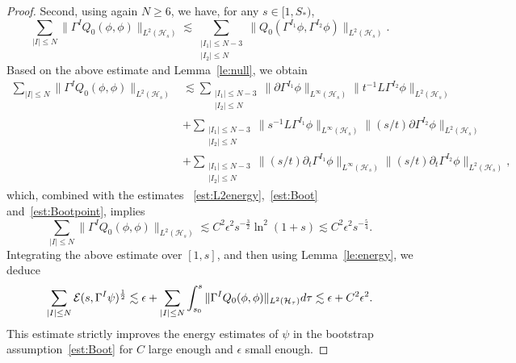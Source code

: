 \documentclass[10pt,a4paper]{amsart}
\def \d {{\rm{d}}}
\begin{document}
\begin{proof}
\smallskip
Second, using again $N\ge 6$, we have, for any $s\in [1,S_{*})$,  
\begin{equation*}
     \sum_{|I|\le N}\|\Gamma^{I}Q_{0}(\phi,\phi)\|_{L^{2}(\mathcal{H}_{s})}
    \lesssim \sum_{\substack{|I_{1}|\le N-3\\ |I_{2}|\le N}}
    \|Q_{0}(\Gamma^{I_{1}}\phi,\Gamma^{I_{2}}\phi)\|_{L^{2}(\mathcal{H}_{s})}.
\end{equation*}
Based on the above estimate and Lemma~\ref{le:null}, we obtain 
\begin{equation*}
\begin{aligned}
     \sum_{|I|\le N}\|\Gamma^{I}Q_{0}(\phi,\phi)\|_{L^{2}(\mathcal{H}_{s})}
    &\lesssim \sum_{\substack{|I_{1}|\le N-3\\ |I_{2}|\le N}}
    \|\partial \Gamma^{I_{1}}\phi\|_{L^{\infty}(\mathcal{H}_{s})}
    \|t^{-1}L\Gamma^{I_{2}}\phi\|_{L^{2}(\mathcal{H}_{s})}\\
    &+\sum_{\substack{|I_{1}|\le N-3\\ |I_{2}|\le N}}
    \|s^{-1}L\Gamma^{I_{1}}\phi\|_{L^{\infty}(\mathcal{H}_{s})}
    \|(s/t)\partial \Gamma^{I_{2}}\phi\|_{L^{2}(\mathcal{H}_{s})}\\
    &+\sum_{\substack{|I_{1}|\le N-3\\ |I_{2}|\le N}}
    \|(s/t)\partial_{t}\Gamma^{I_{1}}\phi\|_{L^{\infty}(\mathcal{H}_{s})}\|(s/t)\partial_{t}\Gamma^{I_{2}}\phi\|_{L^{2}(\mathcal{H}_{s})},
\end{aligned}
\end{equation*}
which, combined with the estimates ~\eqref{est:L2energy},~\eqref{est:Boot} and~\eqref{est:Bootpoint}, implies
\begin{equation*}
    \sum_{|I|\le N}\|\Gamma^{I}Q_{0}(\phi,\phi)\|_{L^{2}(\mathcal{H}_{s})}\lesssim C^{2}\epsilon^{2}s^{-\frac{3}{2}}
    \ln^{2} (1+s)\lesssim C^{2}\epsilon^{2}s^{-\frac{5}{4}}.
\end{equation*}
Integrating the above estimate over $[1,s]$, and then using Lemma~\ref{le:energy}, we deduce
\begin{equation*}
    \sum_{|I|\le N}\mathcal{E}(s,\Gamma^{I}\psi)^{\frac{1}{2}}
    \lesssim  \epsilon
    +\sum_{|I|\le N}\int_{s_{0}}^{s}\|\Gamma^{I}Q_{0}(\phi,\phi)\|_{L^{2}(\mathcal{H}_{\tau})}\d \tau
    \lesssim
    \epsilon+C^{2}\epsilon^{2}.
\end{equation*}
This estimate strictly improves the energy estimates of $\psi$ in the bootstrap assumption~\eqref{est:Boot} for  $C$ large enough and $\epsilon$ small enough.


\end{proof}
\end{document}
